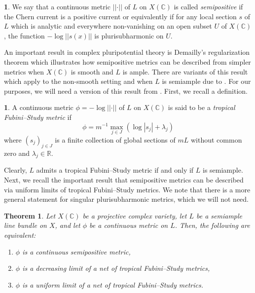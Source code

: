 \documentclass[11pt,reqno]{amsart}
\newcommand{\mR}{\mathbb{R}}
\newcommand{\mC}{\mathbb{C}}
\newcommand{\nrm}[1]{\left|\left |#1\right |\right |}
\theoremstyle{theorem}
\numberwithin{equation}{subsection}
\newtheorem{theorem}[subsubsection]{Theorem}
\numberwithin{equation}{subsection}
\theoremstyle{definition}
\newtheorem{definition}[subsubsection]{\text{Definition}}
\theoremstyle{remark}
\numberwithin{equation}{subsubsection} \numberwithin{figure}{section}
\newcommand{\cdef}[1]{\textsf{\textit{#1}}}
\begin{document}
\begin{definition}
We say that a continuous metric $\nrm{\cdot}$ of $L$ on $X(\mC)$ is called \cdef{semipositive} if the Chern current is a positive current or equivalently if for any local section $s$ of $L$ which is analytic and everywhere non-vanishing on an open subset $U$ of $X(\mC)$, the function $-\log\nrm{s(x)}$ is plurisubharmonic on $U$. 
\end{definition}

An important result in complex pluripotential theory is Demailly's regularization theorem \cite{Demailly:Regularization} which illustrates how semipositive metrics can be described from simpler metrics when $X(\mC)$ is smooth and $L$ is ample. 
There are variants of this result which apply to the non-smooth setting and when $L$ is semiample due to \cite[Theorem 7.1]{BoucksomEriksson:SpaceNorms}. 
For our purposes, we will need a version of this result from \cite{PilleSchneider:Global}. 
First, we recall a definition.

\begin{definition}\label{defn:Hermitian_TFS}
A continuous metric $\phi = -\log\nrm{\cdot}$ of $L$ on $X(\mC)$ is said to be a \cdef{tropical Fubini--Study metric} if 
\[
\phi  = m^{-1}\max_{j\in J} (\log |s_j| + \lambda_j)
\]
where $(s_j)_{j\in J}$ is a finite collection of global sections of $mL$ without common zero and $\lambda_j \in \mR$. 
\end{definition}

Clearly, $L$ admits a tropical Fubini--Study metric if and only if $L$ is semiample. 
Next, we recall the important result that semipositive metrics can be described via uniform limits of tropical Fubini--Study metrics. 
We note that there is a more general statement for singular plurisubharmonic metrics, which we will not need. 

\begin{theorem}\label{thm:eqiuvalentcomplexHermitianline}
Let $X(\mC)$ be a projective complex variety, let $L$ be a semiample line bundle on $X$, and let $\phi$ be a continuous metric on $L$. 
Then, the following are equivalent:
\begin{enumerate}
\item $\phi$ is a continuous semipositive metric,
\item $\phi$ is a decreasing limit of a net of tropical Fubini--Study metrics,
\item $\phi$ is a uniform limit of a net of tropical Fubini--Study metrics. 
\end{enumerate}
\end{theorem}
\end{document}
